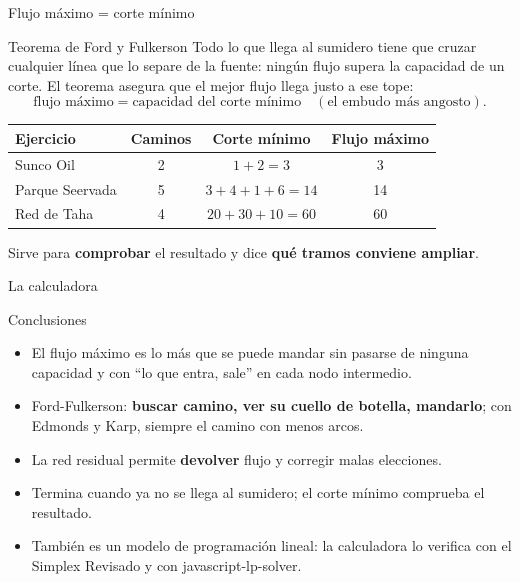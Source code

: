 \documentclass[aspectratio=169]{beamer}
\begin{document}
\begin{frame}{Flujo máximo = corte mínimo}
  \begin{block}{Teorema de Ford y Fulkerson}
    Todo lo que llega al sumidero tiene que cruzar cualquier línea que lo separe de la fuente: ningún flujo
    supera la capacidad de un corte. El teorema asegura que el mejor flujo llega justo a ese tope:
    \[ \text{flujo máximo} = \text{capacidad del corte mínimo} \quad (\text{el embudo más angosto}). \]
  \end{block}
  \medskip
  \centering
  \begin{tabular}{lccc}
    \toprule
    \textbf{Ejercicio} & \textbf{Caminos} & \textbf{Corte mínimo} & \textbf{Flujo máximo} \\
    \midrule
    Sunco Oil & 2 & $1 + 2 = 3$ & 3 \\
    Parque Seervada & 5 & $3 + 4 + 1 + 6 = 14$ & 14 \\
    Red de Taha & 4 & $20 + 30 + 10 = 60$ & 60 \\
    \bottomrule
  \end{tabular}

  \medskip
  \raggedright
  Sirve para \textbf{comprobar} el resultado y dice \textbf{qué tramos conviene ampliar}.
\end{frame}

\begin{frame}{La calculadora}
  \centering
\end{frame}

\begin{frame}{Conclusiones}
  \begin{itemize}\setlength{\itemsep}{0.6em}
    \item El flujo máximo es lo más que se puede mandar sin pasarse de ninguna capacidad y con
          ``lo que entra, sale'' en cada nodo intermedio.
    \item Ford-Fulkerson: \textbf{buscar camino, ver su cuello de botella, mandarlo}; con Edmonds y Karp, siempre
          el camino con menos arcos.
    \item La red residual permite \textbf{devolver} flujo y corregir malas elecciones.
    \item Termina cuando ya no se llega al sumidero; el corte mínimo comprueba el resultado.
    \item También es un modelo de programación lineal: la calculadora lo verifica con el Simplex Revisado y con
          javascript-lp-solver.
  \end{itemize}
\end{frame}
\end{document}

